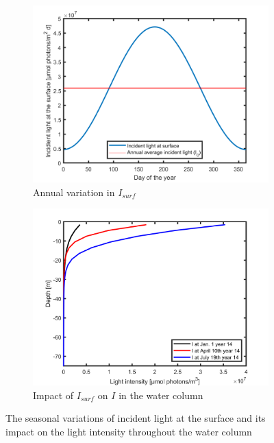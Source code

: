 \begin{figure}[h]
\centering
\begin{subfigure}{.5\textwidth}
  \centering
  \includegraphics[width=\linewidth]{Pictures/Lightvariation.png}
  \caption{Annual variation in $I_{surf}$}
  \label{fig:Isurfvar}
\end{subfigure}%
\begin{subfigure}{.5\textwidth}
  \centering
  \includegraphics[width=\linewidth]{Pictures/ISeasonalVar.png}
  \caption{Impact of $I_{surf}$ on $I$ in the water column}
  \label{fig:Ivariation}
\end{subfigure}
\caption{The seasonal variations of incident light at the surface and its impact on the light intensity throughout the water column}
\label{fig:IandIsurfVar}
\end{figure}

